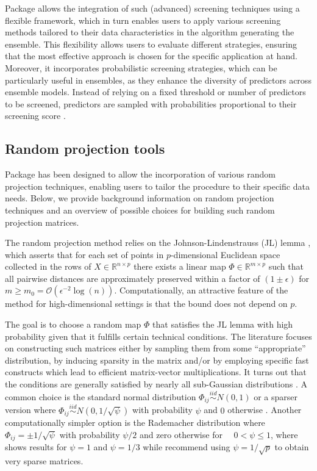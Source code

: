 \documentclass[
  article,
  nojss]{jss}
\begin{document}
Package  allows the integration of such (advanced) screening
techniques using a flexible framework, which in turn enables users to
apply various screening methods tailored to their data characteristics
in the algorithm generating the ensemble. This flexibility allows users
to evaluate different strategies, ensuring that the most effective
approach is chosen for the specific application at hand. Moreover, it
incorporates probabilistic screening strategies, which can be
particularly useful in ensembles, as they enhance the diversity of
predictors across ensemble models. Instead of relying on a fixed
threshold or number of predictors to be screened, predictors are sampled
with probabilities proportional to their screening score
\citep[see][]{Dunson2020TargRandProj, parzer2024glms}.

\subsection{Random projection tools}\label{sec-rps}

Package  has been designed to allow the incorporation of
various random projection techniques, enabling users to tailor the
procedure to their specific data needs. Below, we provide background
information on random projection techniques and an overview of possible
choices for building such random projection matrices.

The random projection method relies on the Johnson-Lindenstrauss (JL)
lemma \citep{JohnsonLindenstrauss1984}, which asserts that for each set
of points in \(p\)-dimensional Euclidean space collected in the rows of
\(X\in \mathbb{R}^{n\times p}\) there exists a linear map
\(\Phi\in \mathbb{R}^{m \times p}\) such that all pairwise distances are
approximately preserved within a factor of \((1\pm\epsilon)\) for
\(m\geq m_0=\mathcal O(\epsilon^{-2}\log(n))\). Computationally, an
attractive feature of the method for high-dimensional settings is that
the bound does not depend on \(p\).

The goal is to choose a random map \(\Phi\) that satisfies the JL lemma
with high probability given that it fulfills certain technical
conditions. The literature focuses on constructing such matrices either
by sampling them from some ``appropriate'' distribution, by inducing
sparsity in the matrix and/or by employing specific fast constructs
which lead to efficient matrix-vector multiplications. It turns out that
the conditions are generally satisfied by nearly all sub-Gaussian
distributions \citep{matouvsek2008variants}. A common choice is the
standard normal distribution \(\Phi_{ij} \overset{iid}{\sim} N(0,1)\)
\citep{FRANKL1988JLSphere} or a sparser version where
\(\Phi_{ij}\overset{iid}{\sim} N(0,1/\sqrt{\psi})\) with probability
\(\psi\) and \(0\) otherwise \citep{matouvsek2008variants}. Another
computationally simpler option is the Rademacher distribution where
\(\Phi_{ij} =  \pm 1/\sqrt{\psi}\) with probability \(\psi/2\) and zero
otherwise for \(\quad 0<\psi\leq 1\), where \citet{ACHLIOPTAS2003JL}
shows results for \(\psi=1\) and \(\psi=1/3\) while
\citet{LiHastie2006VerySparseRP} recommend using \(\psi=1/\sqrt{p}\) to
obtain very sparse matrices.
\end{document}

